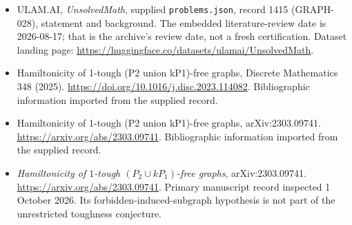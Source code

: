 \documentclass[11pt,a4paper]{article}
\begin{document}
{\small

\begin{itemize}

\item[\hypertarget{source:1415:1}{S1}] ULAM.AI, \emph{UnsolvedMath}, supplied \texttt{problems.json}, record 1415 (GRAPH-028), statement and background. The embedded literature-review date is 2026-08-17; that is the archive’s review date, not a fresh certification. Dataset landing page: \url{https://huggingface.co/datasets/ulamai/UnsolvedMath}.

\item[\hypertarget{source:1415:2}{S2}] Hamiltonicity of 1-tough (P2 union kP1)-free graphs, Discrete Mathematics 348 (2025). \url{https://doi.org/10.1016/j.disc.2023.114082}. Bibliographic information imported from the supplied record.

\item[\hypertarget{source:1415:3}{S3}] Hamiltonicity of 1-tough (P2 union kP1)-free graphs, arXiv:2303.09741. \url{https://arxiv.org/abs/2303.09741}. Bibliographic information imported from the supplied record.


\item[E1] \emph{Hamiltonicity of $1$-tough
$(P_2\cup kP_1)$-free graphs}, arXiv:2303.09741.
\url{https://arxiv.org/abs/2303.09741}. Primary manuscript record
inspected 1 October 2026. Its forbidden-induced-subgraph hypothesis
is not part of the unrestricted toughness conjecture.

\end{itemize}

}

\label{end:1415}
\end{document}
